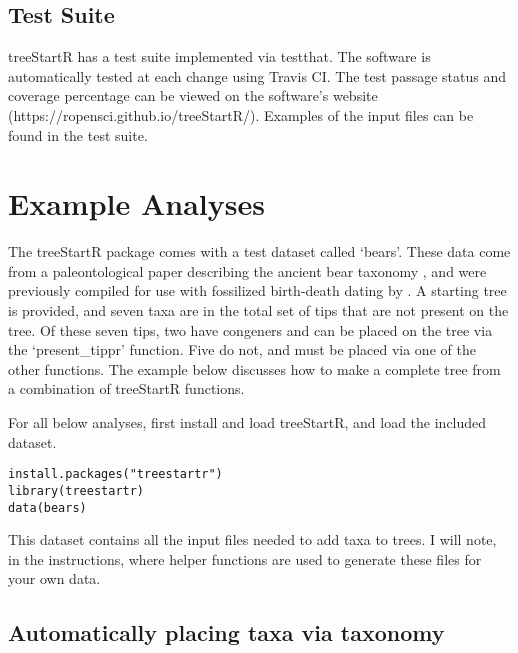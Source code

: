 \documentclass[11pt]{article}
\begin{document}
\subsection{Test Suite}

treeStartR has a test suite implemented via testthat. 
The software is automatically tested at each change using Travis CI. 
The test passage status and coverage percentage can be viewed on the software's website (https://ropensci.github.io/treeStartR/).
Examples of the input files can be found in the test suite.

\section{Example Analyses}

The treeStartR package comes with a test dataset called `bears'.
These data come from a paleontological paper describing the ancient bear taxonomy \citep{abella2011}, and were previously compiled for use with fossilized birth-death dating by \cite*{Heath2014}.
A starting tree is provided, and seven taxa are in the total set of tips that are not present on the tree.
Of these seven tips, two have congeners and can be placed on the tree via the `present\_tippr' function.
Five do not, and must be placed via one of the other functions. 
The example below discusses how to make a complete tree from a combination of treeStartR functions. 

For all below analyses, first install and load treeStartR, and load the included dataset.

{\tt \begin{snugshade*}
\begin{lstlisting}
install.packages("treestartr")
library(treestartr)
data(bears)
\end{lstlisting}
\end{snugshade*}}

This dataset contains all the input files needed to add taxa to trees. 
I will note, in the instructions, where helper functions are used to generate these files for your own data.

\subsection{Automatically placing taxa via taxonomy}
\end{document}
